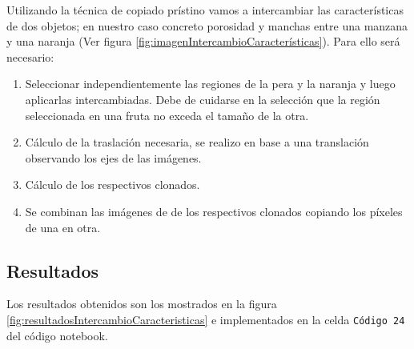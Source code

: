 \documentclass[11pt,twoside,titlepage,a4paper]{article}
\numberwithin{equation}{section} %
\theoremstyle{usual}
\begin{document}
Utilizando la técnica de copiado prístino vamos a intercambiar las características de dos objetos; en nuestro caso concreto porosidad y manchas entre una manzana y una naranja (Ver figura \ref{fig:imagenIntercambioCaracterísticas}). Para ello será necesario: 

\begin{enumerate}
    \item Seleccionar independientemente las regiones de la pera y la naranja y luego aplicarlas intercambiadas. Debe de cuidarse en la selección que la región seleccionada en una fruta no exceda el tamaño de la otra.
    \item Cálculo de la traslación necesaria, se realizo en base a una translación observando los ejes de las imágenes. 
    \item Cálculo de los respectivos clonados.
    \item Se combinan las imágenes de de los respectivos clonados copiando los píxeles de una en otra. 
\end{enumerate}

\subsection{Resultados}

Los resultados obtenidos son los mostrados en la figura \ref{fig:resultadosIntercambioCaracteristicas} e implementados en la celda \texttt{Código 24} del código notebook.
\end{document}
